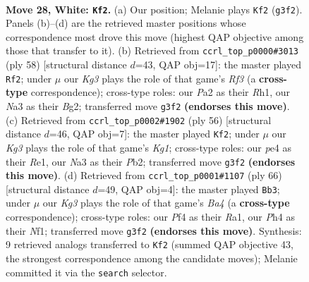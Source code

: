 \documentclass[11pt]{article}
\begin{document}
\clearpage

\begin{figure}[p]\centering
\begin{subfigure}{0.46\textwidth}\centering
\resizebox{\linewidth}{!}{%
\newchessgame
\chessboard[
  setfen={1r6/pp4k1/6pp/2pr4/4pP1P/N3PbK1/PP6/1RB5 w - - 0 28},
  showmover=false,
  pgfstyle=straightmove, color=movearrow, markmove={g3-f2}
]}
\caption{}
\end{subfigure}\hfill
\begin{subfigure}{0.46\textwidth}\centering
\resizebox{\linewidth}{!}{%
\newchessgame
\chessboard[
  setfen={3r4/4k2p/p2pPpp1/1p6/4rbPP/P1P2R2/KP4B1/7R w - - 1 30},
  showmover=false,
  pgfstyle=straightmove, color=movearrow, markmove={f3-f2}
]}
\caption{}
\end{subfigure}
\\[4pt]
\begin{subfigure}{0.46\textwidth}\centering
\resizebox{\linewidth}{!}{%
\newchessgame
\chessboard[
  setfen={8/5kpp/1rp2p2/8/pBp1P3/P2b1P2/1P4PP/4R1K1 w - - 2 29},
  showmover=false,
  pgfstyle=straightmove, color=movearrow, markmove={g1-f2}
]}
\caption{}
\end{subfigure}\hfill
\begin{subfigure}{0.46\textwidth}\centering
\resizebox{\linewidth}{!}{%
\newchessgame
\chessboard[
  setfen={8/2rn1pkp/6p1/p1bp4/B2p4/P2P2PP/2P2P2/R4NK1 w - - 2 34},
  showmover=false,
  pgfstyle=straightmove, color=movearrow, markmove={a4-b3}
]}
\caption{}
\end{subfigure}
\caption{\textbf{Move 28, White: \texttt{Kf2}.} (a) Our position; Melanie plays \texttt{Kf2} (\texttt{g3f2}). Panels (b)--(d) are the retrieved master positions whose correspondence most drove this move (highest QAP objective among those that transfer to it). (b) Retrieved from \texttt{ccrl\_top\_p0000\#3013} (ply 58) [structural distance $d$=43, QAP obj=17]: the master played \texttt{Rf2}; under $\mu$ our \emph{Kg3} plays the role of that game's \emph{Rf3} (a \textbf{cross-type} correspondence); cross-type roles: our \emph{P}a2 as their \emph{R}h1, our \emph{N}a3 as their \emph{B}g2; transferred move \texttt{g3f2} \textbf{(endorses this move)}. (c) Retrieved from \texttt{ccrl\_top\_p0002\#1902} (ply 56) [structural distance $d$=46, QAP obj=7]: the master played \texttt{Kf2}; under $\mu$ our \emph{Kg3} plays the role of that game's \emph{Kg1}; cross-type roles: our \emph{p}e4 as their \emph{R}e1, our \emph{N}a3 as their \emph{P}b2; transferred move \texttt{g3f2} \textbf{(endorses this move)}. (d) Retrieved from \texttt{ccrl\_top\_p0001\#1107} (ply 66) [structural distance $d$=49, QAP obj=4]: the master played \texttt{Bb3}; under $\mu$ our \emph{Kg3} plays the role of that game's \emph{Ba4} (a \textbf{cross-type} correspondence); cross-type roles: our \emph{P}f4 as their \emph{R}a1, our \emph{P}h4 as their \emph{N}f1; transferred move \texttt{g3f2} \textbf{(endorses this move)}. Synthesis: 9 retrieved analogs transferred to \texttt{Kf2} (summed QAP objective 43, the strongest correspondence among the candidate moves); Melanie committed it via the \texttt{search} selector.}
\label{fig:thought-m54}
\end{figure}
\end{document}
